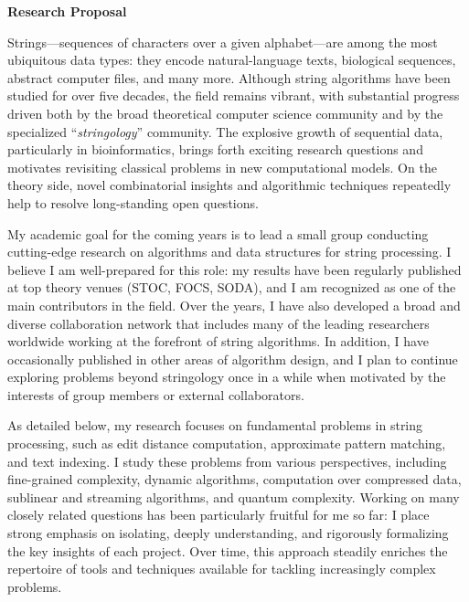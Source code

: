 \documentclass[a4paper,11pt]{article}
\begin{document}
\thispagestyle{firststyle}
\begin{center}
{\bfseries {Research Proposal}}
\end{center}\vspace{-.25cm}

Strings---sequences of characters over a given alphabet---are among the most ubiquitous data types: they encode natural-language texts, biological sequences, abstract computer files, and many more. 
Although string algorithms have been studied for over five decades, the field remains vibrant, with substantial progress driven both by the broad theoretical computer science community and by the specialized ``\mbox{\emph{stringology}}'' community.
The explosive growth of sequential data, particularly in bioinformatics, brings forth exciting research questions and motivates revisiting classical problems in new computational models.
On the theory side, novel combinatorial insights and algorithmic techniques repeatedly help to resolve long-standing open questions.

My academic goal for the coming years is to lead a small group conducting cutting-edge research on algorithms and data structures for string processing.
I believe I am well-prepared for this role: my results have been regularly published at top theory venues (STOC, FOCS, SODA), and I am recognized as one of the main contributors in the field.
Over the years, I have also developed a broad and diverse collaboration network that includes many of the leading researchers worldwide working at the forefront of string algorithms.
In addition, I have occasionally published in other areas of algorithm design, and I plan to continue exploring problems beyond stringology once in a while when motivated by the interests of group members or external collaborators.

As detailed below, my research focuses on fundamental problems in string processing, such as edit distance computation, approximate pattern matching, and text indexing. 
I study these problems from various perspectives, including fine-grained complexity, dynamic algorithms, computation over compressed data, sublinear and streaming algorithms, and quantum complexity. 
Working on many closely related questions has been particularly fruitful for me so far: I place strong emphasis on isolating, deeply understanding, and rigorously formalizing the key insights of each project. 
Over time, this approach steadily enriches the repertoire of tools and techniques available for tackling increasingly complex problems.
\end{document}
